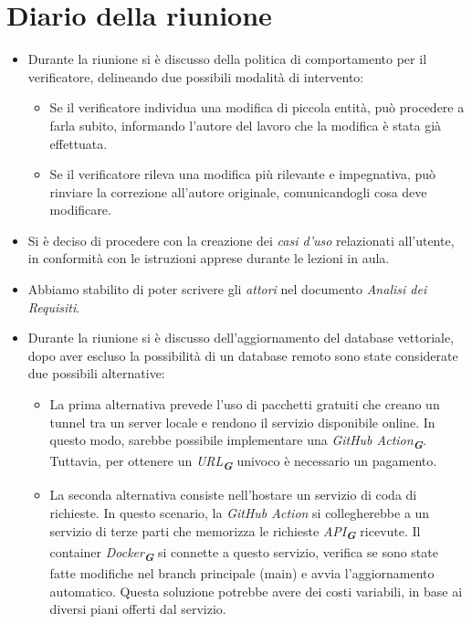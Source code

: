 
\section{Diario della riunione}

\begin{itemize}
    \item Durante la riunione si è discusso della politica di comportamento per il verificatore, delineando due possibili modalità di intervento:
    \begin{itemize}
    \item Se il verificatore individua una modifica di piccola entità, può procedere a farla subito, informando l'autore del lavoro che la modifica è stata già effettuata.
    \item Se il verificatore rileva una modifica più rilevante e impegnativa, può rinviare la correzione all'autore originale, comunicandogli cosa deve modificare.
    \end{itemize}
    \item Si è deciso di procedere con la creazione dei \emph{casi d'uso} relazionati all'utente, in conformità con le istruzioni apprese durante le lezioni in aula.
    \item Abbiamo stabilito di poter scrivere gli \emph{attori} nel documento \emph{Analisi dei Requisiti}.
    \item Durante la riunione si è discusso dell'aggiornamento del database vettoriale, dopo aver escluso la possibilità di un database remoto sono state considerate due possibili alternative:
    \begin{itemize}
        \item La prima alternativa prevede l'uso di pacchetti gratuiti che creano un tunnel tra un server locale e rendono il servizio disponibile online. In questo modo, sarebbe possibile implementare una \emph{GitHub Action}\textsubscript{\textit{\textbf{G}}}. Tuttavia, per ottenere un \emph{URL}\textsubscript{\textit{\textbf{G}}} univoco è necessario un pagamento.
        \item La seconda alternativa consiste nell'hostare un servizio di coda di richieste. In questo scenario, la \emph{GitHub Action} si collegherebbe a un servizio di terze parti che memorizza le richieste \emph{API}\textsubscript{\textit{\textbf{G}}} ricevute. Il container \emph{Docker}\textsubscript{\textit{\textbf{G}}} si connette a questo servizio, verifica se sono state fatte modifiche nel branch principale (main) e avvia l'aggiornamento automatico. Questa soluzione potrebbe avere dei costi variabili, in base ai diversi piani offerti dal servizio.

\end{itemize}
\end{itemize}
